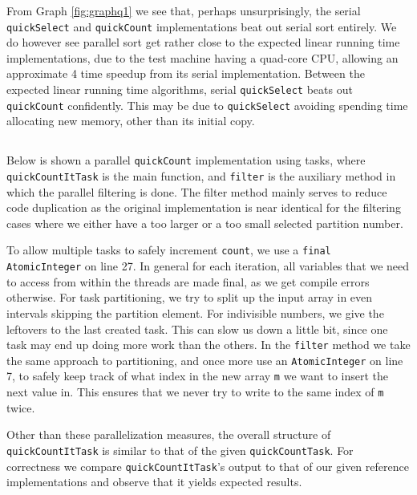 \documentclass[a5paper]{article}
\begin{document}
From Graph \ref{fig:graphq1} we see that, perhaps unsurprisingly, the serial \texttt{quickSelect} and \texttt{quickCount} implementations beat out serial sort entirely.
We do however see parallel sort get rather close to the expected linear running time implementations, due to the test machine having a quad-core CPU,
allowing an approximate 4 time speedup from its serial implementation. Between the expected linear running time algorithms, serial \texttt{quickSelect} beats out \texttt{quickCount} confidently. This may be due to \texttt{quickSelect} avoiding spending time allocating new memory, other than its initial copy.

\subsection{}
Below is shown a parallel \texttt{quickCount} implementation using tasks, where \texttt{quickCountItTask} is the main function, and \texttt{filter} is the auxiliary method
in which the parallel filtering is done. The filter method mainly serves to reduce code duplication as the original implementation is near identical
for the filtering cases where we either have a too larger or a too small selected partition number.

To allow multiple tasks to safely increment \texttt{count}, we use a \texttt{final AtomicInteger} on line 27. In general for each iteration, all variables that we need to access
from within the threads are made final, as we get compile errors otherwise. For task partitioning, we try to split up the input array in even intervals skipping the partition element. For indivisible numbers,
we give the leftovers to the last created task. This can slow us down a little bit, since one task may end up doing more work than the others. In the \texttt{filter} method we take the same
approach to partitioning, and once more use an \texttt{AtomicInteger} on line 7, to safely keep track of what index in the new array \texttt{m} we want to insert the next value in. This ensures that
we never try to write to the same index of \texttt{m} twice.

Other than these parallelization measures, the overall structure of \texttt{quickCountItTask} is similar to that of the given \texttt{quickCountTask}.
For correctness we compare \texttt{quickCountItTask}'s output to that of our given reference implementations and observe that it yields expected results.
\end{document}
